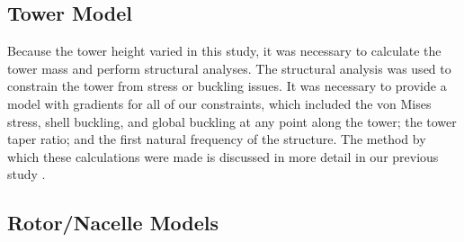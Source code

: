 \documentclass[WESD, manuscript]{copernicus}
\begin{document}
	\subsection{Tower Model}
	Because the tower height varied in this study, it was necessary to calculate the tower mass and perform structural analyses.
The structural analysis was used to constrain the tower from stress or buckling issues. 
It was necessary to provide a model with gradients for all of our constraints, which included the von Mises stress, shell buckling, and global buckling at any point along the tower; the tower taper ratio; and the first natural frequency of the structure. The method by which these calculations were made is discussed in more detail in our previous study \citep{stanley2018}.

	\subsection{Rotor/Nacelle Models}
	\label{rotor_nacelle}
\end{document}

